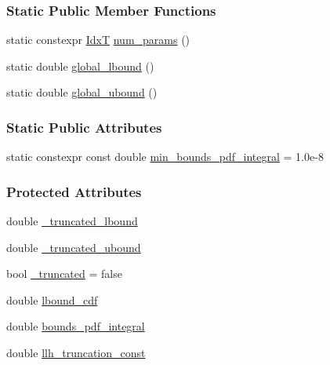 \subsubsection*{Static Public Member Functions}
\begin{DoxyCompactItemize}
\item 
static constexpr \hyperlink{namespaceprior__hessian_aa8d589f74e88bfa3b5750118acd1ab78}{IdxT} \hyperlink{classprior__hessian_1_1TruncatedDist_a8b9c8e1373c9682a49750cc1dad566c5}{num\+\_\+params} ()
\item 
static double \hyperlink{classprior__hessian_1_1TruncatedDist_a428f9be18df6710e160ee967b0f3a663}{global\+\_\+lbound} ()
\item 
static double \hyperlink{classprior__hessian_1_1TruncatedDist_a79ec1c99c3aac7d38309e17808e422ab}{global\+\_\+ubound} ()
\end{DoxyCompactItemize}
\subsubsection*{Static Public Attributes}
\begin{DoxyCompactItemize}
\item 
static constexpr const double \hyperlink{classprior__hessian_1_1TruncatedDist_ac349a0a87f48b62b4d72fa4ca6942fd7}{min\+\_\+bounds\+\_\+pdf\+\_\+integral} = 1.\+0e-\/8
\end{DoxyCompactItemize}
\subsubsection*{Protected Attributes}
\begin{DoxyCompactItemize}
\item 
double \hyperlink{classprior__hessian_1_1TruncatedDist_accfebab73796b8a354b93bdcddfce0d8}{\+\_\+truncated\+\_\+lbound}
\item 
double \hyperlink{classprior__hessian_1_1TruncatedDist_a587fc5fedb96d7380e8085a70dd55560}{\+\_\+truncated\+\_\+ubound}
\item 
bool \hyperlink{classprior__hessian_1_1TruncatedDist_aca705570da7ead8a28ff37171fdb5d6e}{\+\_\+truncated} = false
\item 
double \hyperlink{classprior__hessian_1_1TruncatedDist_a2de07a8235d9853a6dfe265fb2ec1ad4}{lbound\+\_\+cdf}
\item 
double \hyperlink{classprior__hessian_1_1TruncatedDist_a5670fabde8feb0c09ca92ef5dfeba3a6}{bounds\+\_\+pdf\+\_\+integral}
\item 
double \hyperlink{classprior__hessian_1_1TruncatedDist_ad2c7a842ec19d01a2f8c1daa50336ddd}{llh\+\_\+truncation\+\_\+const}
\end{DoxyCompactItemize}


